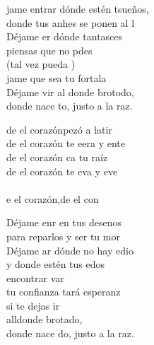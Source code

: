 \begin{cancion}%
	jame entrar dónde estén tsueños,\\
	donde tus anhes se ponen al l  \\
	Déjame er dónde tantasces  \\
	piensas que no pdes \\
	(tal vez pueda )\\
	jame que sea tu fortala  \\
	Déjame vir al donde brotodo, \\
	donde nace to, justo a la raz. \\
	\begin{chorus}%
	de el corazónpezó a latir  \\
	de el corazón te eera y ente  \\
	de el corazón ca tu raíz  \\
	de el corazón te eva y eve  \\
{}\vspace*{-0.4cm}\\
	e el corazón,de el con  \\
	\end{chorus}%
	Déjame enr en tus desenos  \\
	para reparlos y ser tu mor  \\
	Déjame ar dónde no hay edio \\
	y donde estén tus edos \\
	encontrar var \\
	tu confianza tará esperanz\\
si te dejas ir \\
	alldonde brotado,\\
	donde nace do, justo a la raz.\\

\end{cancion}
